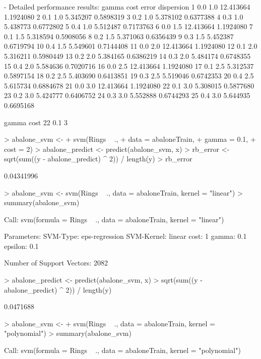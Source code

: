 \documentclass{article}
\begin{document}
\begin{Schunk}
\begin{Soutput}
- Detailed performance results:
   gamma cost     error dispersion
1    0.0  1.0 12.413664  1.1924080
2    0.1  1.0  5.345207  0.5898319
3    0.2  1.0  5.378102  0.6377388
4    0.3  1.0  5.438773  0.6772802
5    0.4  1.0  5.512487  0.7173763
6    0.0  1.5 12.413664  1.1924080
7    0.1  1.5  5.318594  0.5908056
8    0.2  1.5  5.371063  0.6356439
9    0.3  1.5  5.452387  0.6719794
10   0.4  1.5  5.549601  0.7144408
11   0.0  2.0 12.413664  1.1924080
12   0.1  2.0  5.316211  0.5980449
13   0.2  2.0  5.384165  0.6386219
14   0.3  2.0  5.484174  0.6748355
15   0.4  2.0  5.584636  0.7020716
16   0.0  2.5 12.413664  1.1924080
17   0.1  2.5  5.312537  0.5897154
18   0.2  2.5  5.403690  0.6413851
19   0.3  2.5  5.519046  0.6742353
20   0.4  2.5  5.615734  0.6884678
21   0.0  3.0 12.413664  1.1924080
22   0.1  3.0  5.308015  0.5877680
23   0.2  3.0  5.424777  0.6406752
24   0.3  3.0  5.552888  0.6744293
25   0.4  3.0  5.644935  0.6695168
\end{Soutput}
\begin{Soutput}
   gamma cost
22   0.1    3
\end{Soutput}
\begin{Sinput}
> abalone_svm <-
+   svm(Rings ~ .,
+       data = abaloneTrain,
+       gamma = 0.1,
+       cost = 2)
> abalone_predict <- predict(abalone_svm, x)
> rb_error <- sqrt(sum((y - abalone_predict) ^ 2)) / length(y)
> rb_error
\end{Sinput}
\begin{Soutput}
[1] 0.04341996
\end{Soutput}
\begin{Sinput}
> abalone_svm <- svm(Rings ~ ., data = abaloneTrain, kernel = "linear")
> summary(abalone_svm)
\end{Sinput}
\begin{Soutput}
Call:
svm(formula = Rings ~ ., data = abaloneTrain, kernel = "linear")


Parameters:
   SVM-Type:  eps-regression 
 SVM-Kernel:  linear 
       cost:  1 
      gamma:  0.1 
    epsilon:  0.1 


Number of Support Vectors:  2082
\end{Soutput}
\begin{Sinput}
> abalone_predict <- predict(abalone_svm, x)
> sqrt(sum((y - abalone_predict) ^ 2)) / length(y)
\end{Sinput}
\begin{Soutput}
[1] 0.0471688
\end{Soutput}
\begin{Sinput}
> abalone_svm <-
+   svm(Rings ~ ., data = abaloneTrain, kernel = "polynomial")
> summary(abalone_svm)
\end{Sinput}
\begin{Soutput}
Call:
svm(formula = Rings ~ ., data = abaloneTrain, kernel = "polynomial")



\end{Soutput}
\end{Schunk}
\end{document}
